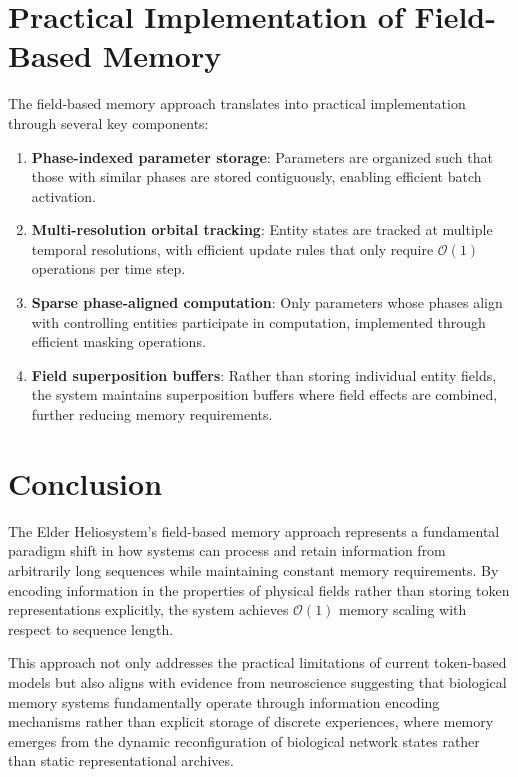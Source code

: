 \section{Practical Implementation of Field-Based Memory}

The field-based memory approach translates into practical implementation through several key components:

\begin{enumerate}
    \item \textbf{Phase-indexed parameter storage}: Parameters are organized such that those with similar phases are stored contiguously, enabling efficient batch activation.
    
    \item \textbf{Multi-resolution orbital tracking}: Entity states are tracked at multiple temporal resolutions, with efficient update rules that only require $\mathcal{O}(1)$ operations per time step.
    
    \item \textbf{Sparse phase-aligned computation}: Only parameters whose phases align with controlling entities participate in computation, implemented through efficient masking operations.
    
    \item \textbf{Field superposition buffers}: Rather than storing individual entity fields, the system maintains superposition buffers where field effects are combined, further reducing memory requirements.
\end{enumerate}

\section{Conclusion}

The Elder Heliosystem's field-based memory approach represents a fundamental paradigm shift in how systems can process and retain information from arbitrarily long sequences while maintaining constant memory requirements. By encoding information in the properties of physical fields rather than storing token representations explicitly, the system achieves $\mathcal{O}(1)$ memory scaling with respect to sequence length.

This approach not only addresses the practical limitations of current token-based models but also aligns with evidence from neuroscience suggesting that biological memory systems fundamentally operate through information encoding mechanisms rather than explicit storage of discrete experiences, where memory emerges from the dynamic reconfiguration of biological network states rather than static representational archives.
